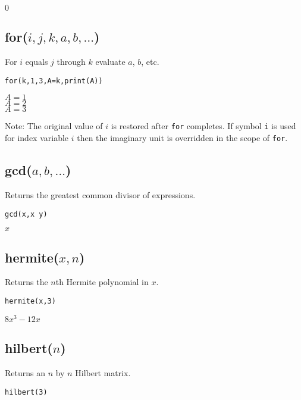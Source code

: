 \noindent
$0$

\subsection*{for($i,j,k,a,b,\ldots$)}

For $i$ equals $j$ through $k$ evaluate $a$, $b$, etc.

{\color{blue}
\begin{verbatim}
for(k,1,3,A=k,print(A))
\end{verbatim}
}

\noindent
$A=1$\\
$A=2$\\
$A=3$

\bigskip
\noindent
Note: The original value of $i$ is restored after {\tt for} completes.
If symbol {\tt i} is used for index variable $i$
then the imaginary unit is overridden in the scope of {\tt for}.

\subsection*{gcd($a,b,\ldots$)}

Returns the greatest common divisor of expressions.

{\color{blue}
\begin{verbatim}
gcd(x,x y)
\end{verbatim}
}

\noindent
$x$

\subsection*{hermite($x,n$)}

Returns the $n$th Hermite polynomial in $x$.

{\color{blue}
\begin{verbatim}
hermite(x,3)
\end{verbatim}
}

\noindent
$\displaystyle 8x^3-12x$


\subsection*{hilbert($n$)}

Returns an $n$ by $n$ Hilbert matrix.

{\color{blue}
\begin{verbatim}
hilbert(3)
\end{verbatim}
}

